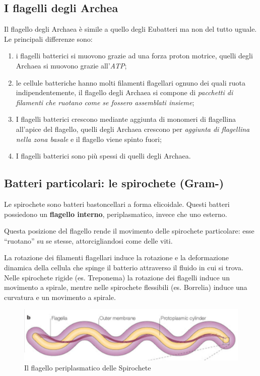 \documentclass[11pt]{book}
\begin{document}
\subsection{I flagelli degli Archea}

Il flagello degli Archaea è simile a quello degli Eubatteri ma non del tutto uguale. 
Le principali differenze sono:
\begin{enumerate}
\item i flagelli batterici si muovono grazie ad una forza proton motrice, quelli degli Archaea si muovono grazie all’\emph{ATP};
\item le cellule batteriche hanno molti filamenti flagellari ognuno dei quali ruota indipendentemente, il flagello degli Archaea si compone di \emph{pacchetti di filamenti che ruotano come se fossero assemblati insieme};
\item I flagelli batterici crescono mediante aggiunta di monomeri di flagellina all’apice del flagello, quelli degli Archaea crescono per \emph{aggiunta di flagellina nella zona basale} e il flagello viene spinto fuori;
\item I flagelli batterici sono più spessi di quelli degli Archaea.
\end{enumerate}

\subsection{Batteri particolari: le spirochete (Gram-)}

Le spirochete sono batteri bastoncellari a forma elicoidale. 
Questi batteri possiedono un \textbf{flagello interno}, periplasmatico, invece che uno esterno.

Questa posizione del flagello rende il movimento delle spirochete particolare: esse “ruotano” su se stesse, attorcigliandosi come delle viti.

La rotazione dei filamenti flagellari induce la rotazione e la deformazione dinamica della cellula che spinge il batterio attraverso il fluido in cui si trova.
Nelle spirochete rigide (es. Treponema) la rotazione dei flagelli induce un movimento a spirale, mentre nelle spirochete flessibili (es. Borrelia) induce una curvatura e un movimento a spirale.

\begin{figure}[htp]
\centering
\includegraphics[scale=0.4]{img/Flagello Spirochete.png}
\caption{Il flagello periplasmatico delle Spirochete}
\label{}
\end{figure}
\end{document}
